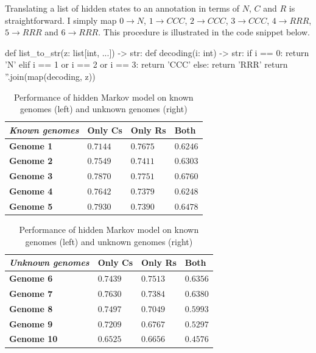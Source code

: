 \documentclass[11pt]{article}
\begin{document}
Translating a list of hidden states to an annotation in terms of $N$, $C$ and $R$ is straightforward.
I simply map $0 \to N$, $1 \to CCC$, $2 \to CCC$, $3 \to CCC$, $4 \to RRR$, $5 \to RRR$ and $6 \to RRR$.
This procedure is illustrated in the code snippet below.
\begin{python}
def list_to_str(z: list[int, ...]) -> str:
    def decoding(i: int) -> str:
        if i == 0:
            return 'N'
        elif i == 1 or i == 2 or i == 3:
            return 'CCC'
        else:
            return 'RRR'
    return ''.join(map(decoding, z))
\end{python}
\begin{table}
	\centering
	\begin{tabular}{|l|lll|}
		\hline
		\textit{Known genomes} & \textbf{Only Cs} & \textbf{Only Rs} & \textbf{Both} \\ \hline
		\textbf{Genome 1} & $0.7144$ & $0.7675$ & $0.6246$ \\
		\textbf{Genome 2} & $0.7549$ & $0.7411$ & $0.6303$ \\
		\textbf{Genome 3} & $0.7870$ & $0.7751$ & $0.6760$ \\
		\textbf{Genome 4} & $0.7642$ & $0.7379$ & $0.6248$ \\
		\textbf{Genome 5} & $0.7930$ & $0.7390$ & $0.6478$ \\
		\hline
	\end{tabular} \hfill
	\begin{tabular}{|l|lll|}
		\hline
		\textit{Unknown genomes} & \textbf{Only Cs} & \textbf{Only Rs} & \textbf{Both} \\ \hline
		\textbf{Genome 6} & $0.7439$ & $0.7513$ & $0.6356$ \\
		\textbf{Genome 7} & $0.7630$ & $0.7384$ & $0.6380$ \\
		\textbf{Genome 8} & $0.7497$ & $0.7049$ & $0.5993$ \\
		\textbf{Genome 9} & $0.7209$ & $0.6767$ & $0.5297$ \\
		\textbf{Genome 10} & $0.6525$ & $0.6656$ & $0.4576$ \\
		\hline
	\end{tabular}
	\caption{Performance of hidden Markov model on known genomes (left) and unknown genomes (right)}
\end{table}
\end{document}
